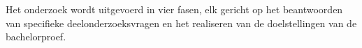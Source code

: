 
\chapter{}%
\label{ch:methodologie}


Het onderzoek wordt uitgevoerd in vier fasen, elk gericht op het beantwoorden van specifieke deelonderzoeksvragen en het realiseren van de doelstellingen van de bachelorproef.

